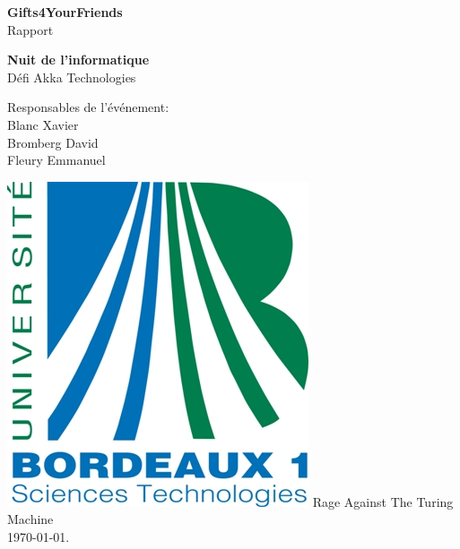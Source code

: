 \documentclass[a4paper,francais,titlepage]{article}
\begin{document}
\begin{titlepage}
 \begin{center}
	\vspace*{3.5cm}
	\Large \textbf{Gifts4YourFriends} \\
	\vspace{0.2cm}
	\small Rapport
	\vspace{2cm}

	\huge \textbf{Nuit de l'informatique} \\
	\vspace{0.3cm}
	\large {Défi Akka Technologies}
	\vspace{1.5cm}
 \end{center}
 
 \begin{flushleft}
	\normalsize {\hspace{6cm}Responsables de l'événement: \\ 
				 \hspace{7.0cm} Blanc Xavier \\
				 \hspace{6.7cm} Bromberg David \\
				 \hspace{6.6cm} Fleury Emmanuel}
	\vspace{2cm}
 \end{flushleft}
 
   \begin{center}
   \includegraphics[scale=0.3]{logo_bx1.jpg}
   	\vfill 
   	\vspace{2cm}
	\normalsize {Rage Against The Turing Machine\\}
	\vspace{1.5cm} 
	{\today}.
 \end{center}
\end{titlepage}
\end{document}
